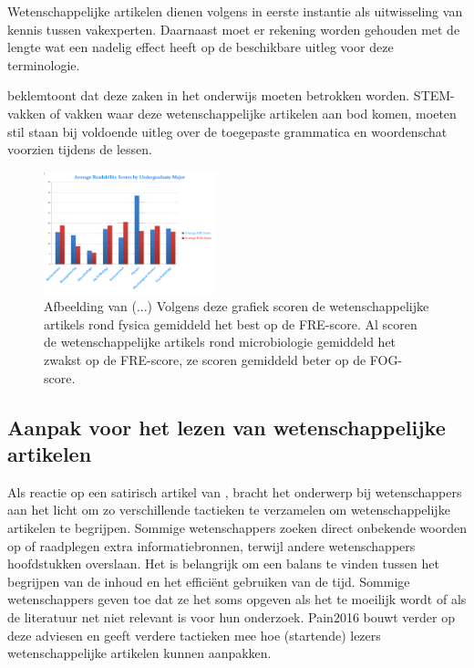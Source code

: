 Wetenschappelijke artikelen dienen volgens \textcite{PlavenSigray2017} in eerste instantie als uitwisseling van kennis tussen vakexperten. Daarnaast moet er rekening worden gehouden met de lengte wat een nadelig effect heeft op de beschikbare uitleg voor deze terminologie.

\textcite{Snow2010} beklemtoont dat deze zaken in het onderwijs moeten betrokken worden. STEM-vakken of vakken waar deze wetenschappelijke artikelen aan bod komen, moeten stil staan bij voldoende uitleg over de toegepaste grammatica en woordenschat voorzien tijdens de lessen.



\begin{figure}[H]
	\includegraphics[width=5cm]{img/fre-fog-per-sector.png}
	\caption{Afbeelding van (...) Volgens deze grafiek scoren de wetenschappelijke artikels rond fysica gemiddeld het best op de FRE-score. Al scoren de wetenschappelijke artikels rond microbiologie gemiddeld het zwakst op de FRE-score, ze scoren gemiddeld beter op de FOG-score.}
\end{figure}

\subsection{Aanpak voor het lezen van wetenschappelijke artikelen}

Als reactie op een satirisch artikel van \textcite{Ruben2016}, bracht \textcite{Pain2016} het onderwerp bij wetenschappers aan het licht om zo verschillende tactieken te verzamelen om wetenschappelijke artikelen te begrijpen. Sommige wetenschappers zoeken direct onbekende woorden op of raadplegen extra informatiebronnen, terwijl andere wetenschappers hoofdstukken overslaan. Het is belangrijk om een balans te vinden tussen het begrijpen van de inhoud en het efficiënt gebruiken van de tijd. Sommige wetenschappers geven toe dat ze het soms opgeven als het te moeilijk wordt of als de literatuur net niet relevant is voor hun onderzoek. {Pain2016} bouwt verder op deze adviesen en geeft verdere tactieken mee hoe (startende) lezers wetenschappelijke artikelen kunnen aanpakken.

